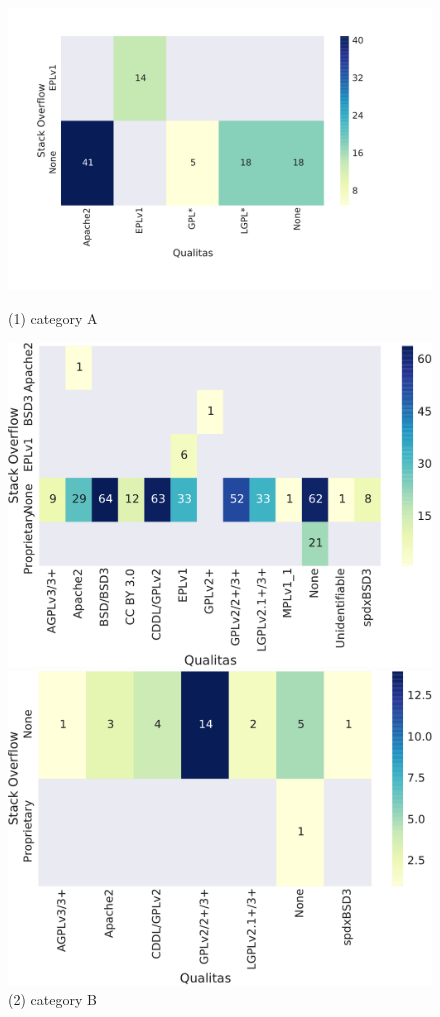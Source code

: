 \documentclass{sig-alternate-05-2015}
\begin{document}
\begin{figure}
	\includegraphics[width=\linewidth]{heatmap_a}
	\caption*{(1) category A}\label{fig:heatmap_a}
	\endminipage\hspace{0.3cm}
	\includegraphics[width=\linewidth]{heatmap_b}
	\caption*{(2) category B}\label{fig:heatmap_b}
	\endminipage\hfill
	\includegraphics[width=\linewidth]{heatmap_c}

\end{figure}
\end{document}
